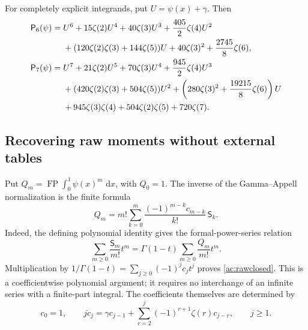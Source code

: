 \documentclass[11pt,a4paper]{article}
\numberwithin{equation}{section}
\theoremstyle{definition}
\theoremstyle{remark}
\DeclareMathOperator{\FP}{FP}
\newcommand{\dd}{\,\mathrm d}
\begin{document}
For completely explicit integrands, put $U=\psi(x)+\gamma$.
Then
\begin{align}\label{ac:P6}
 \mathsf P_6(\psi)={}&U^6+15\zeta(2)U^4+40\zeta(3)U^3
       +\frac{405}{2}\zeta(4)U^2\notag\\
 &+(120\zeta(2)\zeta(3)+144\zeta(5))U
       +40\zeta(3)^2+\frac{2745}{8}\zeta(6),\\
 \mathsf P_7(\psi)={}&U^7+21\zeta(2)U^5+70\zeta(3)U^4
       +\frac{945}{2}\zeta(4)U^3\notag\\
 &+(420\zeta(2)\zeta(3)+504\zeta(5))U^2
       +\left(280\zeta(3)^2+\frac{19215}{8}\zeta(6)\right)U\notag\\
 &+945\zeta(3)\zeta(4)+504\zeta(2)\zeta(5)+720\zeta(7).
       \label{ac:P7}
\end{align}
\subsection{Recovering raw moments without external tables}

Put $Q_m=\FP\int_0^1\psi(x)^m\,\dd x$, with $Q_0=1$.
The inverse of the Gamma--Appell normalization is the finite formula
\begin{equation}\label{ac:rawclosed}
 \boxed{\displaystyle
 Q_m=m!\sum_{k=0}^m\frac{(-1)^{m-k}c_{m-k}}{k!}\,\mathsf S_k.}
\end{equation}
Indeed, the defining polynomial identity gives the formal-power-series
relation
\[
 \sum_{m\ge0}\frac{\mathsf S_m}{m!}t^m
   =\Gamma(1-t)\sum_{m\ge0}\frac{Q_m}{m!}t^m.
\]
Multiplication by $1/\Gamma(1-t)=\sum_{j\ge0}(-1)^jc_jt^j$
proves \eqref{ac:rawclosed}. This is a coefficientwise polynomial
argument; it requires no interchange of an infinite series with a
finite-part integral. The coefficients themselves are determined by
\begin{equation}\label{ac:crecurrence}
 c_0=1,\qquad
 j c_j=\gamma c_{j-1}
       +\sum_{r=2}^j(-1)^{r+1}\zeta(r)c_{j-r},\qquad j\ge1.
\end{equation}
\end{document}
